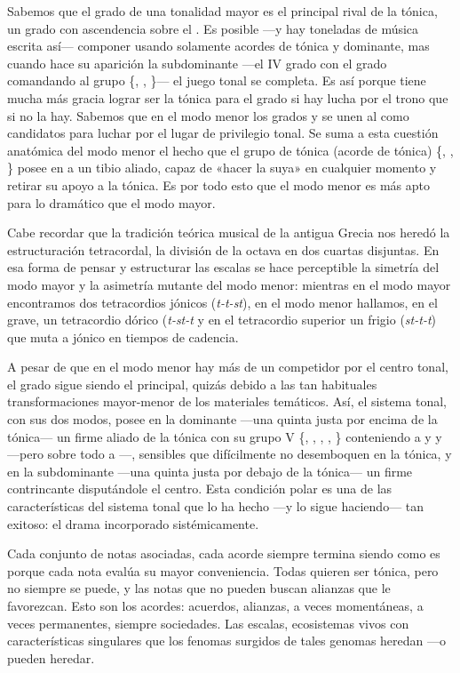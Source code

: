\documentclass[a4paper,10pt]{article}
\begin{document}
\begin{multicols}{2}
Sabemos que el  grado de una tonalidad mayor es el principal rival de la tónica, un grado con ascendencia sobre el . Es posible ---y hay toneladas de música escrita así--- componer usando solamente acordes de tónica y dominante, mas cuando hace su aparición la subdominante ---el IV grado con el  grado comandando al grupo \{, , \}--- el juego tonal se completa. Es así porque tiene mucha más gracia lograr ser la tónica para el  grado si hay lucha por el trono que si no la hay. Sabemos que en el modo menor los grados  y  se unen al  como candidatos para luchar por el lugar de privilegio tonal. Se suma a esta cuestión anatómica del modo menor el hecho que el grupo de tónica (acorde de tónica) \{, , \} posee en  a un tibio aliado, capaz de «hacer la suya» en cualquier momento y retirar su apoyo a la tónica. Es por todo esto que el modo menor es más apto para lo dramático que el modo mayor.

Cabe recordar que la tradición teórica musical de la antigua Grecia nos heredó la estructuración tetracordal, la división de la octava en dos cuartas disjuntas. En esa forma de pensar y estructurar las escalas se hace perceptible la simetría del modo mayor y la asimetría mutante del modo menor: mientras en el modo mayor encontramos dos tetracordios jónicos (\emph{t-t-st}), en el modo menor hallamos, en el grave, un tetracordio dórico (\emph{t-st-t} y en el tetracordio superior un frigio (\emph{st-t-t}) que muta a jónico en tiempos de cadencia.

A pesar de que en el modo menor hay más de un competidor por el centro tonal, el  grado sigue siendo el principal, quizás debido a las tan habituales transformaciones mayor-menor de los materiales temáticos. Así, el sistema tonal, con sus dos modos, posee en la dominante ---una quinta justa por encima de la tónica--- un firme aliado de la tónica con su grupo V \{, , , , \} conteniendo a  y  y  ---pero sobre todo a ---, sensibles que difícilmente no desemboquen en la tónica, y en la subdominante ---una quinta justa por debajo de la tónica--- un firme contrincante disputándole el centro. Esta condición polar es una de las características del sistema tonal que lo ha hecho ---y lo sigue haciendo--- tan exitoso: el drama incorporado sistémicamente.

Cada conjunto de notas asociadas, cada acorde siempre termina siendo como es porque cada nota evalúa su mayor conveniencia. Todas quieren ser tónica, pero no siempre se puede, y las notas que no pueden buscan alianzas que le favorezcan. Esto son los acordes: acuerdos, alianzas, a veces momentáneas, a veces permanentes, siempre sociedades. Las escalas, ecosistemas vivos con características singulares que los fenomas surgidos de tales genomas heredan ---o pueden heredar.


\end{multicols}
\end{document}
